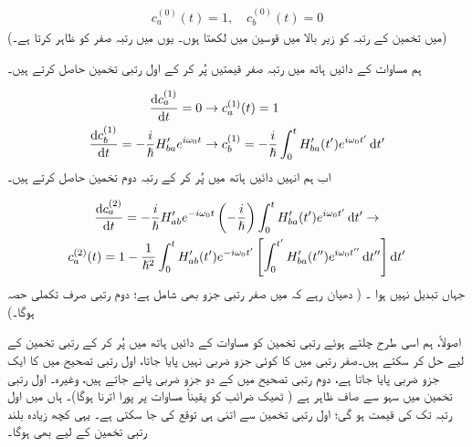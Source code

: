 \begin{align}
	c^{(0)}_a(t)=1,\quad c_b^{(0)}(t)=0
\end{align}
(میں تخمین کے رتبہ کو زیر بالا میں قوسین میں لکھتا ہوں۔ یوں  میں  رتبہ صفر کو ظاہر کرتا ہے۔)

ہم مساوات  کے دائیں ہاتھ میں رتبہ صفر قیمتیں پُر کر کے اول رتبی تخمین حاصل کرتے ہیں۔

\begin{gather}
\begin{aligned}\label{مساوات_تابع_مضطرب_اول_رتبی}
		\frac{\dif c_a^{(1)}}{\dif t}=0&\to c_a^{(1)}(t)=1 \\
		\frac{\dif c_b^{(1)}}{\dif t}=-\frac{i}{\hslash}H'_{ba}e^{i\omega_0t}&\to c_b^{(1)}=-\frac{i}{\hslash}\int_{0}^{t}H'_{ba}(t')e^{i\omega_0t'}\dif t'
\end{aligned}
\end{gather}
اب ہم انہیں دائیں ہاتھ میں پُر کر کے رتبہ دوم تخمین حاصل کرتے ہیں۔

\begin{multline}
		\frac{\dif c_a^{(2)}}{\dif t}=-\frac{i}{\hslash}H'_{ab}e^{-i\omega_0t}\left(-\frac{i}{\hslash}\right)\int_{0}^{t}H'_{ba}(t')e^{i\omega_0t'}\dif t'\to \\
		c_a^{(2)}(t)=1-\frac{1}{\hslash^2}\int_{0}^{t}H'_{ab}(t')e^{-i\omega_0t'}\left[\int_{0}^{t'}H'_{ba}(t'')e^{i\omega_0t''}\dif t''\right]\dif t'
\end{multline}
جہاں  تبدیل نہیں ہوا ۔ ( دھیان رہے کہ  میں صفر رتبی جزو بھی شامل ہے؛ دوم رتبی  صرف تکملی حصہ ہوگا۔)

اصولاً، ہم اسی طرح چلتے ہوئے  رتبی تخمین کو مساوات  کے دائیں ہاتھ میں پُر کر کے  رتبی تخمین کے لیے حل کر سکتے ہیں۔صفر رتبی میں  کا کوئی جزو ضربی نہیں پایا جاتا، اول رتبی تصحیح میں  کا ایک جزو ضربی پایا جاتا ہے، دوم رتبی تصحیح میں  کے دو جزو ضربی پائے جاتے ہیں، وغیرہ۔ اول رتبی تخمین میں سہو 
  سے صاف ظاہر ہے ( ٹھیک ضرائب کو یقیناً مساوات  پر پورا اترنا ہوگا)۔ ہاں  میں اول رتبہ تک  کی قیمت  ہو گی؛ اول رتبی تخمین سے اتنی ہی توقع کی جا سکتی ہے۔ یہی کچھ زیادہ بلند رتبی تخمین کے لیے بھی ہوگا۔

